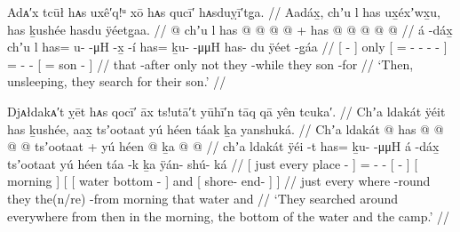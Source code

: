 \ex\label{ex:100-34-unsleeping-search}%
%
\begingl
	\glpreamble	Adᴀ′x tcūł hᴀs uxê′q!ᵘ xō hᴀs qucī′ hᴀsduỵī′tg̣a. //
	\glpreamble	Aadáx̱, chʼu l has ux̱éxʼwx̱u, has ḵushée hasdu ÿéetg̱aa. //
	\gla	{}   @ {} {} 
		chʼu {} l has @   @ {} @ {} @ {} {} {} +
		has @  @ {} @ {}
		{}  @ {}  @ {} {} //
	\glb	{} á -dáx̱ {}
		chʼu {} l has= u-  -μH -x̱ -í {}
		has= ḵu-  -μμH
		{} has- du ÿéet -g̱áa {} //
	\glc	{}[  - {}]
		only {}[  = -  - -\hspace{1ex} - {}]
		= -  -
		{}[ =  son - {}] //
	\gld	{} that -after {}
		only {} not they  {} {} {} -while {}
		they  {} {}
		{}  {} son -for {} //
	\glft	‘Then, unsleeping, they search for their son.’
		//
\endgl
\xe

\ex\label{ex:100-35-search-everywhere}%
%
\begingl
	\glpreamble	Djᴀłdakᴀ′t ỵēt hᴀs qocī′ āx ts!utā′t yūhī′n tāq qā yên tcuka′. //
	\glpreamble	Chʼa ldakát ÿéit has ḵushée, aax̱ tsʼootaat yú héen táak ḵa yanshuká. //
	\gla	{} Chʼa ldakát  @ {} {}
		has @  @ {} @ {}
		{}  @ {} {} 
		{} tsʼootaat {} +
		{} yú {} héen  @ {} {}
		ḵa 
		{}  @ {} @ {} {} {} //
	\glb	{} chʼa ldakát ÿéi -t {}
		has= ḵu-  -μμH
		{} á -dáx̱ {}
		{} tsʼootaat {}
		{} yú {} héen táa -k {}
			ḵa
			{} ÿán- shú- ká {} {} //
	\glc	{}[ just every place - {}]
		= -  -
		{}[  - {}]
		{}[ morning {}]
		{}[ 
			{}[ water bottom - {}]
			and
			{}[ shore- end-  {}] {}] //
	\gld	{} just every where -round {}
		they  {} {}
		{} the(n/re) -from {}
		{} morning {}
		{} that {} water  {} {} 
			and
			{}  {} {} {} {} //
	\glft	‘They searched around everywhere from then in the morning,
		the bottom of the water and the camp.’
		//
\endgl
\xe

